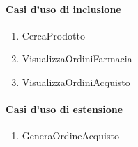 \paragraph{Casi d'uso di inclusione}
\begin{enumerate}
	\item CercaProdotto
	\item VisualizzaOrdiniFarmacia
	\item VisualizzaOrdiniAcquisto
\end{enumerate}

\paragraph{Casi d'uso di estensione}
\begin{enumerate}
	\item GeneraOrdineAcquisto %
\end{enumerate}

